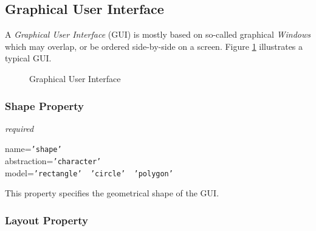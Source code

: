 %
%
%
%
%
%

\subsection{Graphical User Interface}
\label{graphical_user_interface_heading}

A \emph{Graphical User Interface} (GUI) is mostly based on so-called graphical
\emph{Windows} which may overlap, or be ordered side-by-side on a screen.
Figure \ref{graphical_user_interface_figure} illustrates a typical GUI.

\begin{figure}[ht]
    \begin{center}
        \caption{Graphical User Interface}
        \label{graphical_user_interface_figure}
    \end{center}
\end{figure}

\subsubsection{Shape Property}

\emph{required}

name=\texttt{'shape'}\\
abstraction=\texttt{'character'}\\
model=\texttt{'rectangle' \vline\ 'circle' \vline\ 'polygon'}

This property specifies the geometrical shape of the GUI.

\subsubsection{Layout Property}

